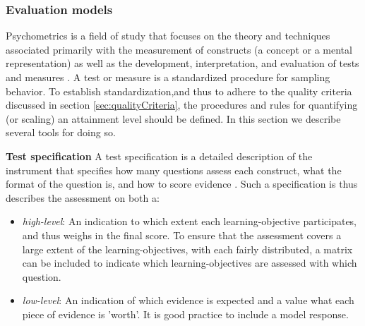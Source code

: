 %




\subsubsection*{Evaluation models}\label{sec:evaluationModels}

Psychometrics is a field of study that focuses on the theory and techniques associated primarily with the measurement of constructs (a concept or a mental representation) as well as the development, interpretation, and evaluation of tests and measures \cite{eignor2013APAstandards}. A test or measure is a standardized procedure for sampling behavior. To establish standardization,and thus to adhere to the quality criteria discussed in section \ref{sec:qualityCriteria}, the procedures and rules for quantifying (or scaling) an attainment level should be defined. In this section we describe several tools for doing so.



\noindent \textbf{Test specification}\newline
A test specification is a detailed description of the instrument that specifies how many questions assess each construct, what the format of the question is, and how to score evidence \cite{2010TewGuzdial}. Such a specification is thus describes the assessment on both a:
\begin{itemize}
\item \emph{high-level}: An indication to which extent each learning-objective participates, and thus weighs in the final score. To ensure that the assessment covers a large extent of the learning-objectives, with each fairly distributed, a matrix can be included to indicate which learning-objectives are assessed with which question.

\item \emph{low-level}: An indication of which evidence is expected and a value what each piece of evidence is 'worth'. It is good practice to include a model response.
\end{itemize}

